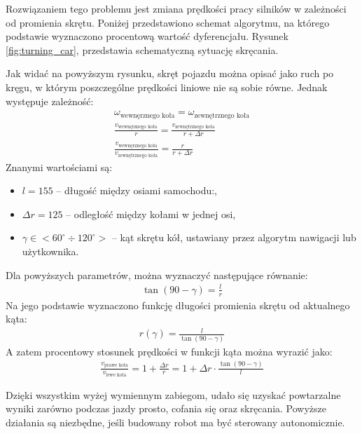         Rozwiązaniem tego problemu jest zmiana prędkości pracy silników w zależności od promienia skrętu.
        Poniżej przedstawiono schemat algorytmu, na którego podstawie wyznaczono procentową wartość dyferencjału.
        Rysunek \ref{fig:turning_car}, przedstawia schematyczną sytuację skręcania.
        

        Jak widać na powyższym rysunku, skręt pojazdu można opisać jako ruch po kręgu, w którym poszczególne prędkości liniowe nie są sobie równe.
        Jednak występuje zależność:
        \begin{gather}
            \omega_{\text{wewnęrznego koła}} = \omega_{\text{zewnętrznego koła}}\\
            \frac{v_{\text{wewnęrznego koła}}}{r} = \frac{v_{\text{zewnętrznego koła}}}{r + \Delta r}\\
            \frac{v_\text{wewnęrznego koła}}{v_{\text{zewnętrznego koła}}} = \frac{r}{r + \Delta r}
        \end{gather}
        Znanymi wartościami są:
        \begin{itemize}
            \item $l = 155$ -- długość między osiami samochodu:,
            \item $\Delta r = 125$ -- odległość między kołami w jednej osi,
            \item $\gamma \in <60^\circ \div 120^\circ>$ -- kąt skrętu kół, ustawiany przez algorytm nawigacji lub użytkownika.
        \end{itemize}
        Dla powyższych parametrów, można wyznaczyć następujące równanie:
        \begin{gather}
            \tan \left(90 - \gamma\right) = \frac{l}{r}
        \end{gather}
        Na jego podstawie wyznaczono funkcję długości promienia skrętu od aktualnego kąta:
        \begin{gather}
            r(\gamma) = \frac{l}{\tan(90-\gamma)}
            \label{eq:turning_radius}
        \end{gather}
        A zatem procentowy stosunek prędkości w funkcji kąta można wyrazić jako:
        \begin{gather}
            \frac{v_{\text{prawe koła}}}{v_{\text{lewe koła}}} = 1 + \frac{\Delta r}{r} = 1 + \Delta r \cdot \frac{\tan(90 - \gamma)}{l}
        \end{gather}
    

    Dzięki wszystkim wyżej wymiennym zabiegom, udało się uzyskać powtarzalne wyniki zarówno podczas jazdy prosto, cofania się oraz skręcania.
    Powyższe działania są niezbędne, jeśli budowany robot ma być sterowany autonomicznie.
